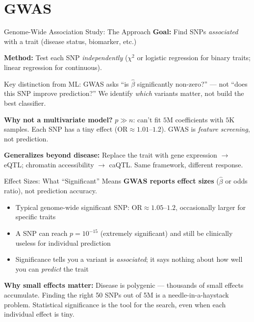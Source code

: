 \documentclass[aspectratio=169,10pt]{beamer}
\begin{document}
\section{GWAS}

\begin{frame}{Genome-Wide Association Study: The Approach}
\textbf{Goal:} Find SNPs \emph{associated} with a trait (disease status, biomarker, etc.)

\textbf{Method:} Test each SNP \emph{independently} ($\chi^2$ or logistic regression for binary traits; linear regression for continuous).

\vspace{0.2em}
\alert{Key distinction from ML:} GWAS asks ``is $\hat{\beta}$ significantly non-zero?'' --- not ``does this SNP improve prediction?'' We identify \emph{which} variants matter, not build the best classifier.

\vspace{0.1em}
{\small \textbf{Why not a multivariate model?} $p \gg n$: can't fit $5$M coefficients with $5$K samples. Each SNP has a tiny effect ($\text{OR} \approx 1.01$--$1.2$). GWAS is \emph{feature screening}, not prediction.}

{\footnotesize \textbf{Generalizes beyond disease:} Replace the trait with gene expression $\to$ eQTL; chromatin accessibility $\to$ caQTL. Same framework, different response.}
\end{frame}

\begin{frame}{Effect Sizes: What ``Significant'' Means}
\textbf{GWAS reports effect sizes} ($\hat{\beta}$ or odds ratio), not prediction accuracy.

\vspace{0.2em}
\begin{itemize}[<+->]
    \item Typical genome-wide significant SNP: $\text{OR} \approx 1.05$--$1.2$, occasionally larger for specific traits
    \item A SNP can reach $p = 10^{-15}$ (extremely significant) and still be \alert{clinically useless} for individual prediction
    \item Significance tells you a variant is \emph{associated}; it says nothing about how well you can \emph{predict} the trait
\end{itemize}

\vspace{0.3em}
\textbf{Why small effects matter:} Disease is polygenic --- thousands of small effects accumulate. Finding the right 50 SNPs out of 5M is a needle-in-a-haystack problem. Statistical significance is the tool for the search, even when each individual effect is tiny.
\end{frame}
\end{document}
